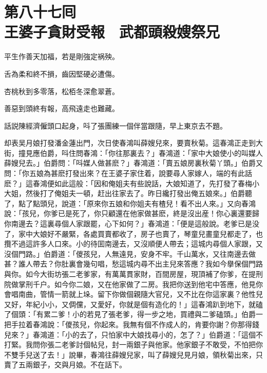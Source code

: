 
\chapter*{第八十七囘　\\王婆子貪財受報　武都頭殺嫂祭兄}


\begin{myquote}
平生作善天加福，若是剛強定祸殃。

舌為柔和終不損，齒因堅硬必遭傷。

杏桃秋到多零落，松栢冬深愈翠蒼。

善惡到頭終有報，高飛遠走也難藏。
\end{myquote}

話説陳經濟僱頭口起身，呌了張團練一個伴當跟隨，早上東京去不題。

却表吴月娘打發潘金蓮出門，次日使春鴻叫薛嫂兒來，要賣秋菊。這春鴻正走到大街，撞見應伯爵，呌住問春鴻：「你往那裏去？」春鴻道：「家中大娘使小的叫媒人薛嫂兒去。」伯爵問：「呌媒人做甚麽？」春鴻道：「賣五娘房裏秋菊丫頭。」伯爵又問：「你五娘為甚麽打發出來？在王婆子家住着，說要尋人家嫁人，端的有此話麽？」這春鴻便如此這般：「因和俺姐夫有些說話，大娘知道了，先打發了春梅小大姐，然後打了俺姐夫一頓，赶出往家去了。昨日纔打發出俺五娘來。」伯爵聽了，點了點頭兒，說道：「原來你五娘和你姐夫有楂兒！看不出人來。」又向春鴻說：「孩兒，你爹已是死了，你只顧還在他家做甚麽，終是沒出産！你心裏還要歸你南邊去？這裏尋個人家跟罷，心下如何？」春鴻道：「便是這般說。老爹已是没了，家中大娘好不嚴緊，各處買賣都收了，房子也賣了，琴童兒畫童兒都走了，也攬不過這許多人口來。小的待囬南邊去，又沒順便人帶去；這城内尋個人家跟，又沒個門路。」伯爵道：「儍孩兒，人無遠見，安身不牢。千山萬水，又往南邊去做甚？誰人帶去？你肚裏會幾句唱，愁這城内尋不出主兒來答應？我如今擧保個門路與你。如今大街坊張二老爹家，有萬萬貫家財，百間房屋，現頂補了你爹，在提刑院做掌刑千户。如今你二娘，又在他家做了二房。我把你送到他宅中答應，他見你會唱南曲，管情一箭就上垛。留下你做個親隨大官兒，又不比在你這家裏？他性兒又好，年紀小小，又倜儻，又愛好，你就是個有造化的！」這春鴻趴到地下，就磕了個頭：「有累二爹！小的若見了張老爹，得一步之地，買禮與二爹磕頭。」伯爵一把手拉着春鴻說：「儍孩兒，你起來。我無有個不作成人的，肯要你謝？你那得錢兒來？」春鴻道：「小的去了，只怕家中大娘找尋小的，怎了？」伯爵道：「這個不打緊。我問你張二老爹討個帖兒，封一兩銀子與他家。他家銀子不敢受，不怕把你不雙手兒送了去！」說畢，春鴻往薛嫂兒家，叫了薛嫂兒見月娘，領秋菊出來，只賣了五兩銀子，交與月娘。不在話下。

